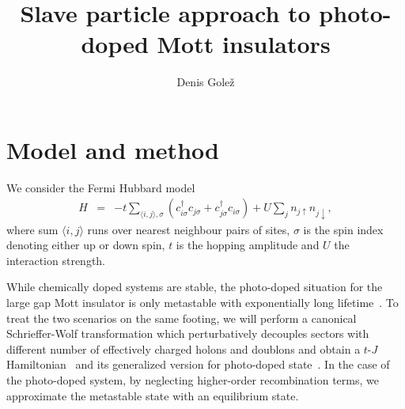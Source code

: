 \documentclass[aps,prb,twocolumn,floats,superscriptaddress,epsfig]{revtex4-1}
\newcommand{\ave}[1]{\langle #1 \rangle}
\begin{document}
\title{Slave particle approach to photo-doped Mott insulators}

\author{Denis Gole{\v z}}


\begin{abstract}

\end{abstract}

\maketitle


\section{Model and method}
\label{hamil}
We consider the Fermi Hubbard model
\begin{eqnarray}\label{eq::Hubbard}
 H &=& -t \sum_{ \ave{i,j} , \sigma} ( c^{\dagger}_{i \sigma} c_{j \sigma} + c^{\dagger}_{j \sigma } c_{i \sigma } ) + U \sum_{j} n_{ j \uparrow } n_{ j \downarrow},   
\end{eqnarray}
where sum $\ave{i,j}$ runs over nearest neighbour pairs of sites, $\sigma$ is the spin index denoting either up or down spin, $t$ is the hopping amplitude and $U$ the interaction strength.

While chemically doped systems are  stable, the photo-doped situation for the large gap Mott insulator is only metastable with exponentially long lifetime~\cite{Strohmaier2010,Sensarma2010a,Zala2013PRL,Eckstein2011thermalization}. To treat the two scenarios on the same footing, we will perform a canonical Schrieffer-Wolf transformation which perturbatively decouples sectors with different number of effectively charged holons and doublons and obtain a $t$-$J$ Hamiltonian~\cite{MacDonald1988}  and its generalized version for photo-doped state~\cite{Li2020,murakami2022,Zala2013PRL}. In the case of the photo-doped system, by neglecting higher-order recombination terms, we approximate the metastable state with an equilibrium state. 
\end{document}
